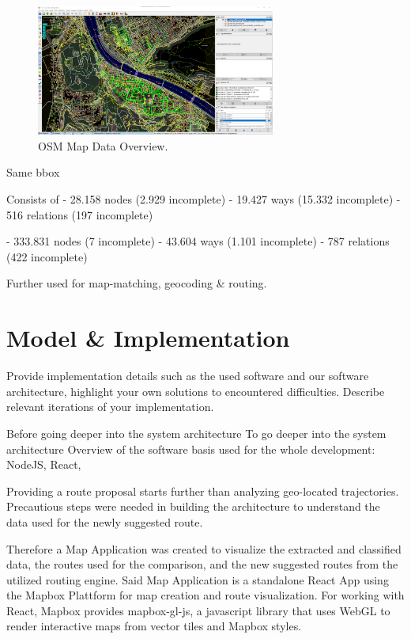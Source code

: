 \begin{figure}[!ht]
  \centering
  \includegraphics[width=0.7\textwidth]{images/DataOSM.png}
  \caption{
  OSM Map Data Overview.
  }
  \label{figure:MapData}
\end{figure}

Same bbox

Consists of
- 28.158 nodes (2.929 incomplete)
- 19.427 ways (15.332 incomplete)
- 516 relations (197 incomplete)

- 333.831 nodes (7 incomplete)
- 43.604 ways (1.101 incomplete)
- 787 relations (422 incomplete)


Further used for map-matching, geocoding & routing.


\section{Model & Implementation}

Provide implementation details such as the used software and our software architecture, highlight your own solutions to encountered difficulties. Describe relevant iterations of your implementation.

Before going deeper into the system architecture 
To go deeper into the system architecture 
Overview of the software basis used for the whole development: 
NodeJS, React,


Providing a route proposal starts further than analyzing geo-located trajectories. Precautious steps were needed in building the architecture to understand the data used for the newly suggested route. 

Therefore a Map Application was created to visualize the extracted and classified data, the routes used for the comparison, and the new suggested routes from the utilized routing engine. Said Map Application is a standalone React App using the Mapbox Plattform for map creation and route visualization. For working with React, Mapbox provides mapbox-gl-js, a javascript library that uses WebGL to render interactive maps from vector tiles and Mapbox styles.

